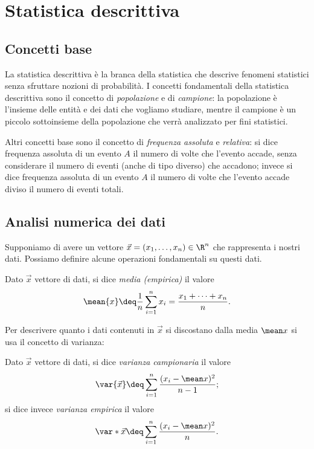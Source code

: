 \chapter{Statistica descrittiva}

\section{Concetti base}

La statistica descrittiva è la branca della statistica che descrive fenomeni statistici senza sfruttare nozioni di probabilità. I concetti fondamentali della statistica descrittiva sono il concetto di \emph{popolazione} e di \emph{campione}: la popolazione è l'insieme delle entità e dei dati che vogliamo studiare, mentre il campione è un piccolo sottoinsieme della popolazione che verrà analizzato per fini statistici.

Altri concetti base sono il concetto di \emph{frequenza assoluta} e \emph{relativa}: si dice frequenza assoluta di un evento $A$ il numero di volte che l'evento accade, senza considerare il numero di eventi (anche di tipo diverso) che accadono; invece si dice frequenza assoluta di un evento $A$ il numero di volte che l'evento accade diviso il numero di eventi totali.

\section{Analisi numerica dei dati}

Supponiamo di avere un vettore $\vec{x} = (x_1, \dots, x_n) \in \R^n$ che rappresenta i nostri dati. Possiamo definire alcune operazioni fondamentali su questi dati.

\begin{definition}
     Dato $\vec x$ vettore di dati, si dice \emph{media (empirica)} il valore \begin{equation}
        \mean{x} \deq \frac{1}{n}\sum_{i=1}^n x_i = \frac{x_1 + \dots + x_n}{n}.
    \end{equation}
\end{definition}

Per descrivere quanto i dati contenuti in $\vec x$ si discostano dalla media $\mean x$ si usa il concetto di varianza:
\begin{definition}
    [Varianza] Dato $\vec x$ vettore di dati, si dice \emph{varianza campionaria} il valore \begin{equation}
        \var{\vec x} \deq \sum_{i=1}^n \frac{(x_i - \mean x)^2}{n-1};
    \end{equation} si dice invece \emph{varianza empirica} il valore \begin{equation}
        \var*{\vec x} \deq \sum_{i=1}^n \frac{(x_i - \mean x)^2}{n}.
    \end{equation}
\end{definition}

